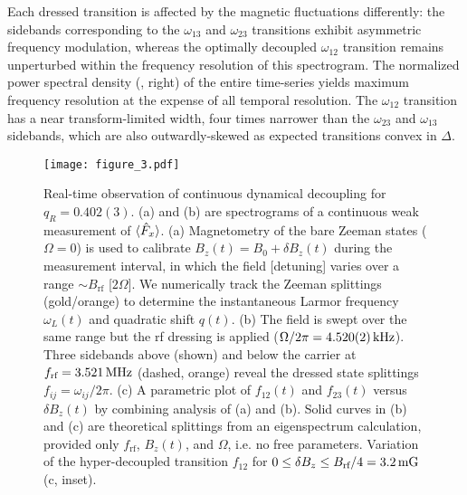 \documentclass[aps,prl,reprint,superscriptaddress,floatfix]{revtex4-1}
\begin{document}
Each dressed transition is affected by the magnetic fluctuations differently: the sidebands corresponding to the $\omega_{13}$ and $\omega_{23}$ transitions exhibit asymmetric frequency modulation, whereas the optimally decoupled $\omega_{12}$ transition remains unperturbed within the frequency resolution of this spectrogram.
The normalized power spectral density (, right) of the entire time-series yields maximum frequency resolution at the expense of all temporal resolution.
The $\omega_{12}$ transition has a near transform-limited width, four times narrower than the $\omega_{23}$ and $\omega_{13}$ sidebands, which are also outwardly-skewed as expected transitions convex in $\Delta$. 
\begin{figure}
    \texttt{[image: figure\_3.pdf]}
    \caption{
    \label{fig:acquisition_pipeline}
        Real-time observation of continuous dynamical decoupling for $q_R = 0.402(3)$.
        (a) and (b) are spectrograms of a continuous weak measurement of $\langle \hat{F}_x \rangle$.
        (a) Magnetometry of the bare Zeeman states ($\Omega=0$) is used to calibrate $B_z(t) = B_0 + \delta B_z(t)$ during the measurement interval, in which the field [detuning] varies over a range $\sim B_{\text{rf}}$ [$2\Omega$].
        We numerically track the Zeeman splittings (gold/orange) to determine the instantaneous Larmor frequency $\omega_L(t)$ and quadratic shift $q(t)$.
       (b) The field is swept over the same range but the rf dressing is applied ($\Omega/2\pi = \unit[4.520(2)]{kHz}$).
       Three sidebands above (shown) and below the carrier at $f_{\text{rf}}=\unit[3.521]{MHz}$ (dashed, orange) reveal the dressed state splittings $f_{ij} = \omega_{ij}/2\pi$.
       (c) A parametric plot of $f_{12}(t)$ and $f_{23}(t)$ versus $\delta B_z(t)$ by combining analysis of (a) and (b).
       Solid curves in (b) and (c) are theoretical splittings from an eigenspectrum calculation, provided only $f_{\text{rf}}$, $B_z(t)$, and $\Omega$, i.e. no free parameters.
       Variation of the hyper-decoupled transition $f_{12}$ for $0 \leq \delta B_z \leq B_{\text{rf}}/4 = \unit[3.2]{mG}$ (c, inset).
    }
\end{figure}
\end{document}
